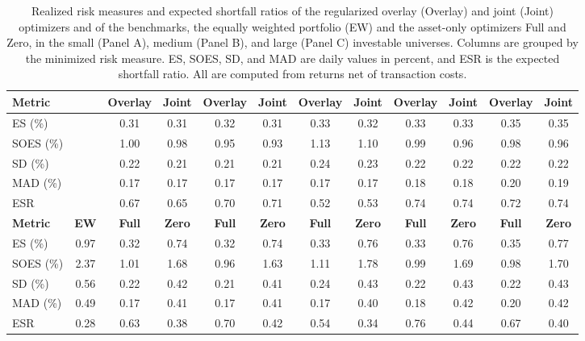 \begin{table}[p]
{\begin{tabular}{l*{11}{c}}
    \textbf{Metric} &  & \textbf{Overlay} & \textbf{Joint} & \textbf{Overlay} & \textbf{Joint} & \textbf{Overlay} & \textbf{Joint} & \textbf{Overlay} & \textbf{Joint} & \textbf{Overlay} & \textbf{Joint} \\
    \midrule
    ES (\%) &  & 0.31 & 0.31 & 0.32 & 0.31 & 0.33 & 0.32 & 0.33 & 0.33 & 0.35 & 0.35 \\
    SOES (\%) &  & 1.00 & 0.98 & 0.95 & 0.93 & 1.13 & 1.10 & 0.99 & 0.96 & 0.98 & 0.96 \\
    SD (\%) &  & 0.22 & 0.21 & 0.21 & 0.21 & 0.24 & 0.23 & 0.22 & 0.22 & 0.22 & 0.22 \\
    MAD (\%) &  & 0.17 & 0.17 & 0.17 & 0.17 & 0.17 & 0.17 & 0.18 & 0.18 & 0.20 & 0.19 \\
    ESR &  & 0.67 & 0.65 & 0.70 & 0.71 & 0.52 & 0.53 & 0.74 & 0.74 & 0.72 & 0.74 \\
    \midrule
    \textbf{Metric} & \textbf{EW} & \textbf{Full} & \textbf{Zero} & \textbf{Full} & \textbf{Zero} & \textbf{Full} & \textbf{Zero} & \textbf{Full} & \textbf{Zero} & \textbf{Full} & \textbf{Zero} \\
    \midrule
    ES (\%) & 0.97 & 0.32 & 0.74 & 0.32 & 0.74 & 0.33 & 0.76 & 0.33 & 0.76 & 0.35 & 0.77 \\
    SOES (\%) & 2.37 & 1.01 & 1.68 & 0.96 & 1.63 & 1.11 & 1.78 & 0.99 & 1.69 & 0.98 & 1.70 \\
    SD (\%) & 0.56 & 0.22 & 0.42 & 0.21 & 0.41 & 0.24 & 0.43 & 0.22 & 0.43 & 0.22 & 0.43 \\
    MAD (\%) & 0.49 & 0.17 & 0.41 & 0.17 & 0.41 & 0.17 & 0.40 & 0.18 & 0.42 & 0.20 & 0.42 \\
    ESR & 0.28 & 0.63 & 0.38 & 0.70 & 0.42 & 0.54 & 0.34 & 0.76 & 0.44 & 0.67 & 0.40 \\
    \bottomrule
  \end{tabular}
  }
  \caption{Realized risk measures and expected shortfall ratios of the regularized overlay (Overlay) and joint (Joint) optimizers and of the benchmarks, the equally weighted portfolio (EW) and the asset-only optimizers Full and Zero, in the small (Panel A), medium (Panel B), and large (Panel C) investable universes. Columns are grouped by the minimized risk measure. ES, SOES, SD, and MAD are daily values in percent, and ESR is the expected shortfall ratio. All are computed from returns net of transaction costs.}
  \label{tab:additional-regularized}
\end{table}

